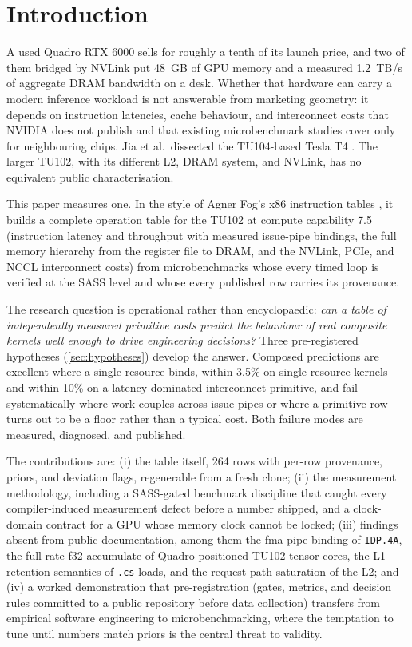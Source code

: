\section{Introduction}
\label{sec:introduction}

A used Quadro RTX 6000 sells for roughly a tenth of its launch price, and
two of them bridged by NVLink put 48~GB of GPU memory and a measured
1.2~TB/s of aggregate DRAM bandwidth on a desk. Whether that hardware can
carry a modern inference workload is not answerable from marketing
geometry: it depends on instruction latencies, cache behaviour, and
interconnect costs that NVIDIA does not publish and that existing
microbenchmark studies cover only for neighbouring chips. Jia et
al.\ dissected the TU104-based Tesla T4 \citep{jia2019turing}. The larger
TU102, with its different L2, DRAM system, and NVLink, has no equivalent
public characterisation.

This paper measures one. In the style of Agner Fog's x86 instruction
tables \citep{fog2025instruction}, it builds a complete operation table
for the TU102 at compute capability 7.5 (instruction latency and
throughput with measured issue-pipe bindings, the full memory hierarchy
from the register file to DRAM, and the NVLink, PCIe, and NCCL
interconnect costs) from microbenchmarks whose every timed loop is
verified at the SASS level and whose every published row carries its
provenance.

The research question is operational rather than encyclopaedic:
\emph{can a table of independently measured primitive costs predict the
behaviour of real composite kernels well enough to drive engineering
decisions?} Three pre-registered hypotheses (\cref{sec:hypotheses}) develop the
answer. Composed predictions are
excellent where a single resource binds, within 3.5\% on
single-resource kernels and within 10\% on a latency-dominated
interconnect primitive, and fail systematically where work couples across issue
pipes or where a primitive row turns out to be a floor rather than a
typical cost. Both failure modes are measured, diagnosed, and published.

The contributions are: (i) the table itself, 264 rows with per-row
provenance, priors, and deviation flags, regenerable from a fresh clone;
(ii) the measurement methodology, including a SASS-gated benchmark
discipline that caught every compiler-induced measurement defect before a
number shipped, and a clock-domain contract for a GPU whose memory clock
cannot be locked; (iii) findings absent from public documentation, among
them the fma-pipe binding of \texttt{IDP.4A}, the full-rate
f32-accumulate of Quadro-positioned TU102 tensor cores, the L1-retention
semantics of \texttt{.cs} loads, and the request-path saturation of the
L2; and (iv) a worked demonstration that pre-registration (gates,
metrics, and decision rules committed to a public repository before data
collection) transfers from empirical software engineering to
microbenchmarking, where the temptation to tune until numbers match
priors is the central threat to validity.

